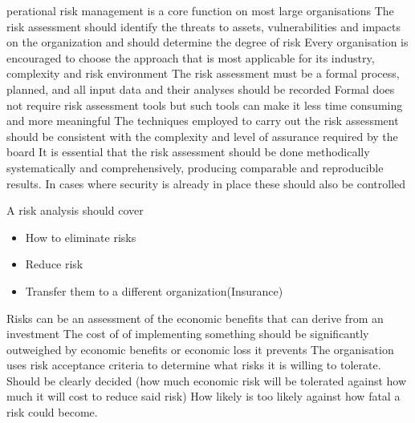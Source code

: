 perational risk management is a core function on most large organisations
The risk assessment should identify the threats to assets, vulnerabilities and impacts on the organization and should determine the degree of risk
Every organisation is encouraged to choose the approach that is most applicable for its industry, complexity and risk environment
The risk assessment must be a formal process, planned, and all input data and their analyses should be recorded
Formal does not require risk assessment tools but such tools can make it less time consuming and more meaningful
The techniques employed to carry out the risk assessment should be consistent with the complexity and level of assurance required by the board
It is essential that the risk assessment should be done methodically systematically and comprehensively, producing comparable and reproducible results.
In cases where security is already in place these should also be controlled

A risk analysis should cover
\begin{itemize}
    \item How to eliminate risks
    \item Reduce risk
    \item Transfer them to a different organization(Insurance)
\end{itemize}
Risks can be an assessment of the economic benefits that can derive from an investment
The cost of of implementing something should be significantly outweighed by economic benefits or economic loss it prevents
The organisation uses risk acceptance criteria to determine what risks it is willing to tolerate.
Should be clearly decided (how much economic risk will be tolerated against how much it will cost to reduce said risk)
How likely is too likely against how fatal a risk could become.

